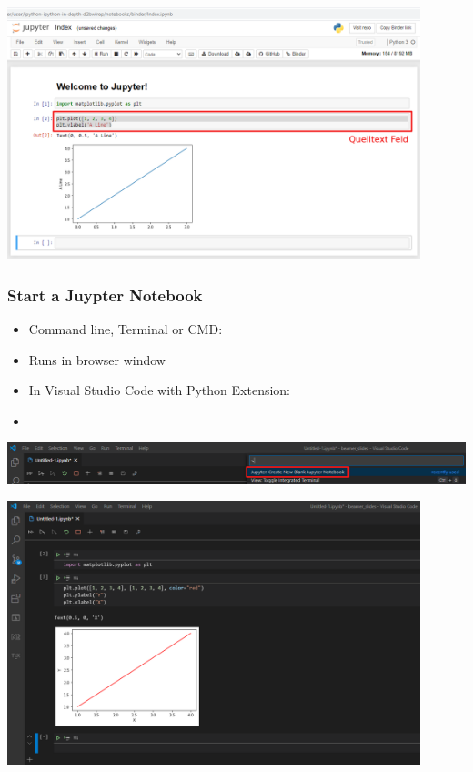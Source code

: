 \begin{frame}
    \begin{center}
      \includegraphics[width=0.9\textwidth]{screenshots/jupyter-1.png}
    \end{center}		
\end{frame}

\begin{frame}
	\frametitle{Start a Juypter Notebook}
    \begin{itemize}
      \item Command line, Terminal or CMD: 
      \item Runs in browser window
			\item In Visual Studio Code with Python Extension: 
			\item {} 			
    \end{itemize}
    \begin{center}
      \includegraphics[width=1.0\textwidth]{screenshots/vsc-2.png}
    \end{center}				
\end{frame}

\begin{frame}
    \begin{center}
      \includegraphics[width=0.9\textwidth]{screenshots/vsc-1.png}
    \end{center}				
\end{frame}

